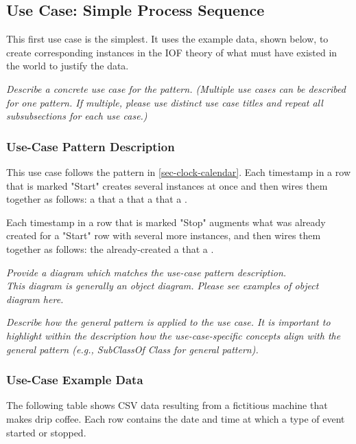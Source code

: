 \subsection*{Use Case: Simple Process Sequence}
This first use case is the simplest. It uses the example data, shown below, to create corresponding instances in the IOF theory of what must have existed in the world to justify the data.

 \textit{ 
Describe a concrete use case for the pattern. (Multiple use cases can be described for one pattern. If multiple, please use distinct use case titles and repeat all subsubsections for each use case.)
  }

\newcommand{\ti}{\cname{bfo}{TemporalInstant }}

\subsubsection*{Use-Case Pattern Description}
This use case follows the pattern in \ref{sec-clock-calendar}.
Each timestamp in a row that is marked "Start" creates several instances at once and then wires them together as follows:
a  that  a \ti that  a  that  a .

Each timestamp in a row that is marked "Stop" augments what was already created for a "Start" row with several more instances, and then wires them together as follows:
the already-created   a  that  a .

 \textit{ 
Provide a diagram which matches the use-case pattern description. \\
\noindent \textit{This diagram is generally an object diagram. Please see examples of object diagram here.}
  }

 \textit{ 
Describe how the general pattern is applied to the use case. It is important to highlight within the description how the use-case-specific concepts align with the general pattern (e.g., SubClassOf Class for general pattern).
  }

\subsubsection*{Use-Case Example Data}
The following table shows CSV data resulting from a fictitious machine that makes drip coffee. Each row contains the date and time at which a type of event started or stopped.



